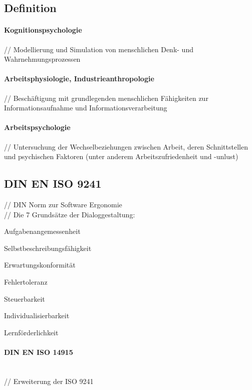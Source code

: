 \documentclass[12pt,a4paper,bibliography=totocnumbered,listof=totocnumbered]{scrartcl}
\begin{document}
\subsection{Definition}
\paragraph{Kognitionspsychologie}
// Modellierung und Simulation von menschlichen Denk- und Wahrnehmungsprozessen\\

\paragraph{Arbeitsphysiologie, Industrieanthropologie}
// Beschäftigung mit grundlegenden menschlichen Fähigkeiten zur Informationsaufnahme und Informationsverarbeitung\\

\paragraph{Arbeitspsychologie}
// Untersuchung der Wechselbeziehungen zwischen Arbeit, deren Schnittstellen und psychischen Faktoren (unter anderem Arbeitszufriedenheit und -unlust)\\

\subsection{DIN EN ISO 9241}
// DIN Norm zur Software Ergonomie\\
// Die 7 Grundsätze der Dialoggestaltung:
\begin{compactitem}
	\item Aufgabenangemessenheit
	\item Selbstbeschreibungsfähigkeit
	\item Erwartungskonformität
	\item Fehlertoleranz
	\item Steuerbarkeit
	\item Individualisierbarkeit
	\item Lernförderlichkeit
\end{compactitem}
\paragraph{DIN EN ISO 14915}
$\;$ \\
// Erweiterung der ISO 9241\\
\end{document}
